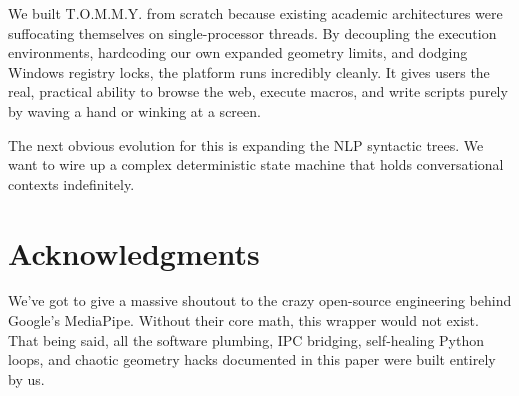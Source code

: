 \documentclass[conference]{IEEEtran}
\begin{document}
We built T.O.M.M.Y. from scratch because existing academic architectures were suffocating themselves on single-processor threads. By decoupling the execution environments, hardcoding our own expanded geometry limits, and dodging Windows registry locks, the platform runs incredibly cleanly. It gives users the real, practical ability to browse the web, execute macros, and write scripts purely by waving a hand or winking at a screen.

The next obvious evolution for this is expanding the NLP syntactic trees. We want to wire up a complex deterministic state machine that holds conversational contexts indefinitely.


\section*{Acknowledgments}
We've got to give a massive shoutout to the crazy open-source engineering behind Google's MediaPipe. Without their core math, this wrapper would not exist. That being said, all the software plumbing, IPC bridging, self-healing Python loops, and chaotic geometry hacks documented in this paper were built entirely by us.
\end{document}
